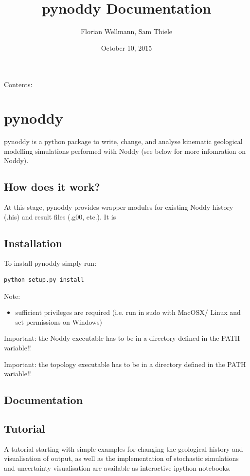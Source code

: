 \documentclass[a4paper,10pt,english]{sphinxmanual}
\title{pynoddy Documentation}
\date{October 10, 2015}
\author{Florian Wellmann, Sam Thiele}
\begin{document}
\maketitle
\tableofcontents
{}\label{index::doc}


Contents:


\chapter{pynoddy}
\label{readme:welcome-to-pynoddy-s-documentation}\label{readme::doc}\label{readme:pynoddy}
pynoddy is a python package to write, change, and analyse kinematic
geological modelling simulations performed with Noddy (see below for
more infomration on Noddy).


\section{How does it work?}
\label{readme:how-does-it-work}
At this stage, pynoddy provides wrapper modules for existing Noddy
history (.his) and result files (.g00, etc.). It is


\section{Installation}
\label{readme:installation}
To install pynoddy simply run:

\begin{Verbatim}[commandchars=\\\{\}]
python setup.py install
\end{Verbatim}

Note:
\begin{itemize}
\item {} 
sufficient privileges are required (i.e. run in sudo with MacOSX/
Linux and set permissions on Windows)

\end{itemize}

Important: the Noddy executable has to be in a directory defined in the
PATH variable!!

Important: the topology executable has to be in a directory defined in
the PATH variable!!


\section{Documentation}
\label{readme:documentation}

\section{Tutorial}
\label{readme:tutorial}
A tutorial starting with simple examples for changing the geological
history and visualisation of output, as well as the implementation of
stochastic simulations and uncertainty visualisation are available as
interactive ipython notebooks.
\end{document}
